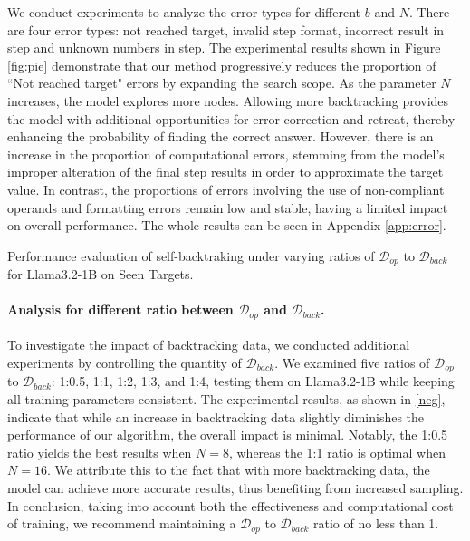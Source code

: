 \documentclass{article}
\theoremstyle{plain}
\theoremstyle{definition}
\theoremstyle{remark}
\begin{document}
We conduct experiments to analyze the error types for different $b$ and $N$. There are four error types: not reached target, invalid step format, incorrect result in step and unknown numbers in step.
The experimental results shown in Figure \ref{fig:pie} demonstrate that our method progressively reduces the proportion of ``Not reached target" errors by expanding the search scope. As the parameter $N$ increases, the model explores more nodes. Allowing more backtracking provides the model with additional opportunities for error correction and retreat, thereby enhancing the probability of finding the correct answer. However, there is an increase in the proportion of computational errors, stemming from the model's improper alteration of the final step results in order to approximate the target value. In contrast, the proportions of errors involving the use of non-compliant operands and formatting errors remain low and stable, having a limited impact on overall performance. The whole results can be seen in Appendix \ref{app:error}.

\begin{table}[t]
\centering
\caption{Performance evaluation of self-backtraking under varying ratios of $\mathcal{D}_{op}$ to $\mathcal{D}_{back}$ for Llama3.2-1B on Seen Targets.}

\label{neg}

\vspace{-10pt}
\end{table}
\paragraph{Analysis for different ratio between $\mathcal{D}_{op}$ and $\mathcal{D}_{back}$.}

To investigate the impact of backtracking data, we conducted additional experiments by controlling the quantity of $\mathcal{D}_{back}$. We examined five ratios of $\mathcal{D}_{op}$ to $\mathcal{D}_{back}$: 1:0.5, 1:1, 1:2, 1:3, and 1:4, testing them on Llama3.2-1B while keeping all training parameters consistent. The experimental results, as shown in \ref{neg}, indicate that while an increase in backtracking data slightly diminishes the performance of our algorithm, the overall impact is minimal. Notably, the 1:0.5 ratio yields the best results when $N=8$, whereas the 1:1 ratio is optimal when $N=16$. We attribute this to the fact that with more backtracking data, the model can achieve more accurate results, thus benefiting from increased sampling. In conclusion, taking into account both the effectiveness and computational cost of training, we recommend maintaining a $\mathcal{D}_{op}$ to $\mathcal{D}_{back}$ ratio of no less than 1.
\end{document}
